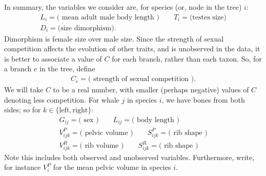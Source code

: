 \documentclass{article}
\begin{document}
In summary, the variables we consider are, for species (or, node in the tree) $i$:
\begin{gather*}
    L_i = \text{( mean adult male body length )}  \qquad   T_i = \text{(testes size)} \\
    D_i = \text{(size dimorphism)} .
\end{gather*}
Dimorphism is female size over male size.
Since the strength of sexual competition affects the evolution of other traits,
and is unobserved in the data,
it is better to associate a value of $C$ for each branch, rather than each taxon.
So, for a branch $e$ in the tree, define
\begin{gather*}
    C_{e} = \text{( strength of sexual competition )}  .
\end{gather*}
We will take $C$ to be a real number, with smaller (perhaps negative) values of $C$ denoting less competition.
For whale $j$ in species $i$, we have bones from both sides; so for $k \in \{\text{left},\text{right}\}$:
\begin{gather*}
    G_{ij} = \text{( sex )} \qquad  L_{ij} = \text{( body length )} \\
    V^P_{ijk} = \text{( pelvic volume )} \qquad S^P_{ijk} = \text{( rib shape )} \\
    V^R_{ijk} = \text{( rib volume )} \qquad S^R_{ijk} = \text{( rib shape )} 
\end{gather*}
Note this includes both observed and unobserved variables.
Furthermore, write, for instance $V^P_i$ for the mean pelvic volume in species $i$.
\end{document}
